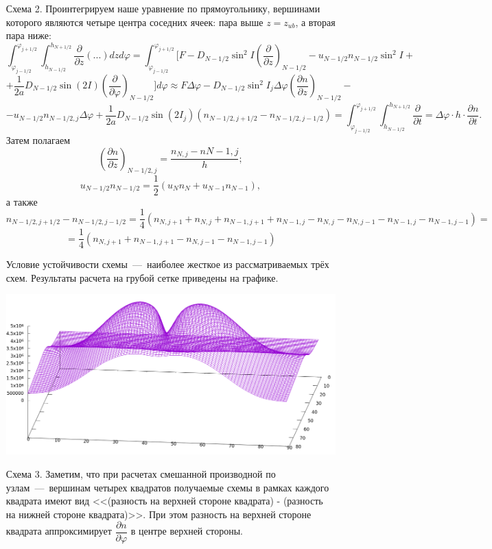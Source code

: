 \documentclass[2pt, a4paper, fleqn]{extarticle}
\begin{document}
\begin{itemize}
\item[Схема 2.] Проинтегрируем наше уравнение по прямоугольнику, вершинами которого являются четыре центра соседних ячеек: пара выше $z = z_{ub}$, а вторая пара ниже: $$\int_{\varphi_{j-1/2}}^{\varphi_{j+1/2}}\int_{h_{N-1/2}}^{h_{N+1/2}} \dfrac{\partial}{\partial z}(...)dzd\varphi = \int_{\varphi_{j-1/2}}^{\varphi_{j+1/2}} \bigg[F - D_{N-1/2}\sin^2 I\left(\dfrac{\partial}{\partial z}\right)_{N-1/2}-u_{N-1/2}n_{N-1/2}\sin^2 I + $$ $$+ \dfrac{1}{2a}D_{N-1/2}\sin(2I)\left(\dfrac{\partial}{\partial \varphi}\right)_{N-1/2}\bigg]d\varphi \approx F\Delta\varphi - D_{N-1/2}\sin^2 I_j\Delta\varphi \left(\dfrac{\partial n}{\partial z}\right)_{N-1/2} - $$ $$-u_{N-1/2}n_{N-1/2, j}\Delta\varphi + \dfrac{1}{2a}D_{N-1/2}\sin(2I_j)(n_{N-1/2, j+1/2}-n_{N-1/2, j-1/2}) = \int_{\varphi_{j-1/2}}^{\varphi_{j+1/2}}\int_{h_{N-1/2}}^{h_{N+1/2}} \dfrac{\partial}{\partial t} = \Delta\varphi \cdot h \cdot \dfrac{\partial n}{\partial t}.$$
Затем полагаем $$\left(\dfrac{\partial n}{\partial z}\right)_{N-1/2, j} = \dfrac{n_{N, j}-n{N-1, j}}{h};$$ $$u_{N-1/2}n_{N-1/2} = \dfrac{1}{2}(u_Nn_N + u_{N-1}n_{N-1}),$$ а также $$n_{N-1/2, j+1/2}-n_{N-1/2, j-1/2} = \dfrac{1}{4}(n_{N, j+1}+n_{N, j}+n_{N-1, j+1}+n_{N-1, j}-n_{N, j}-n_{N, j-1}-n_{N-1, j}-n_{N-1, j-1}) = $$ $$=\dfrac{1}{4}(n_{N, j+1}+n_{N-1, j+1}-n_{N, j-1}-n_{N-1, j-1})$$

Условие устойчивости схемы~---~наиболее жесткое из рассматриваемых трёх схем. Результаты расчета на грубой сетке приведены на графике.

\includegraphics[scale=0.3]{scheme2.png}

\item[Схема 3.] Заметим, что при расчетах смешанной производной по узлам~---~вершинам четырех квадратов получаемые схемы в рамках каждого квадрата имеют вид <<(разность на верхней стороне квадрата) - (разность на нижней стороне квадрата)>>. При этом разность на верхней стороне квадрата аппроксимирует $\dfrac{\partial n}{\partial\varphi}$ в центре верхней стороны.


\end{itemize}
\end{document}
